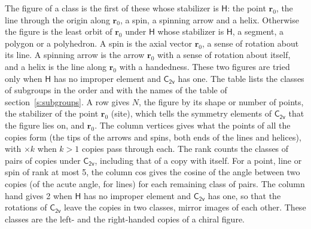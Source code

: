 \documentclass[10pt,a4paper]{article}
\numberwithin{equation}{section}
\newcommand{\grp}[1]{\mathsf{#1}}
\newcommand{\pointr}{\mathbf{r}}
\begin{document}
\leavevmode\label{n:head.figure}The figure of a class is the first of these whose stabilizer is $\grp{H}$: the point $\pointr_0$, the line through the origin along $\pointr_0$, a spin, a spinning arrow and a helix. Otherwise the figure is the least orbit of $\pointr_0$ under $\grp{H}$ whose stabilizer is $\grp{H}$, a segment, a polygon or a polyhedron. A spin is the axial vector $\pointr_0$, a sense of rotation about its line. A spinning arrow is the arrow $\pointr_0$ with a sense of rotation about itself, and a helix is the line along $\pointr_0$ with a handedness. These two figures are tried only when $\grp{H}$ has no improper element and $\grp{C_{2v}}$ has one. The table lists the classes of subgroups in the order and with the names of the table of section~\ref{s:subgroups}. \label{n:head.site}A row gives $N$, the figure by its shape or number of points, the stabilizer of the point $\pointr_0$ (site), which tells the symmetry elements of $\grp{C_{2v}}$ that the figure lies on, and $\pointr_0$. \label{n:head.vertices}The column vertices gives what the points of all the copies form (the tips of the arrows and spins, both ends of the lines and helices), with ${\times}k$ when $k > 1$ copies pass through each. \label{n:head.rank}The rank counts the classes of pairs of copies under $\grp{C_{2v}}$, including that of a copy with itself. \label{n:head.cos}For a point, line or spin of rank at most 5, the column cos gives the cosine of the angle between two copies (of the acute angle, for lines) for each remaining class of pairs. \label{n:head.hand}The column hand gives 2 when $\grp{H}$ has no improper element and $\grp{C_{2v}}$ has one, so that the rotations of $\grp{C_{2v}}$ leave the copies in two classes, mirror images of each other. These classes are the left- and the right-handed copies of a chiral figure.
\end{document}

